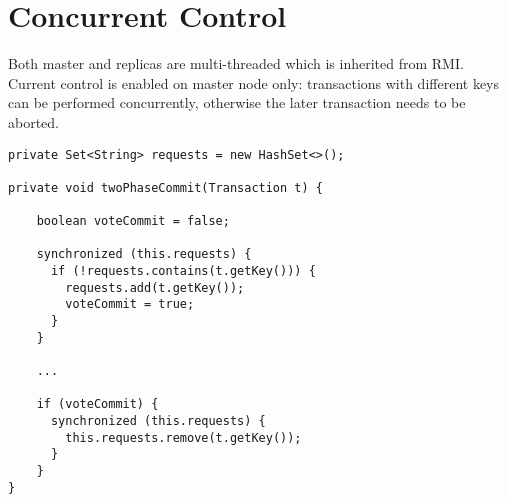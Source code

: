 \documentclass[11pt, oneside]{article}   	%
\begin{document}
\section{Concurrent Control}
\label{sec:concurrent}
Both master and replicas are multi-threaded which is inherited from RMI. \\
Current control is enabled on master node only: transactions with different keys can be performed concurrently, otherwise the later transaction needs to be aborted.
\begin{verbatim}               
private Set<String> requests = new HashSet<>();

private void twoPhaseCommit(Transaction t) {

    boolean voteCommit = false;

    synchronized (this.requests) {
      if (!requests.contains(t.getKey())) {
        requests.add(t.getKey());
        voteCommit = true;
      }
    }
    
    ...
    
    if (voteCommit) {
      synchronized (this.requests) {
        this.requests.remove(t.getKey());
      }
    }
}
\end{verbatim}
\end{document}

